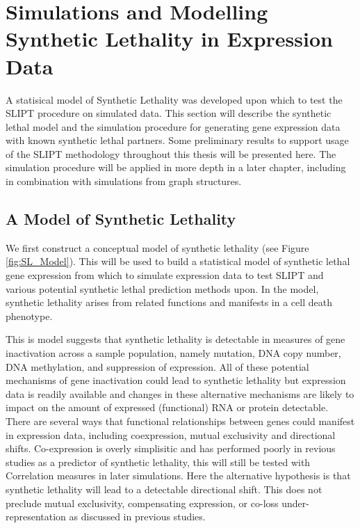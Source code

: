 

\section{Simulations and Modelling Synthetic Lethality in Expression Data}

A statisical model of Synthetic Lethality was developed upon which to test the SLIPT procedure on simulated data. This section will describe the synthetic lethal model and the simulation procedure for generating gene expression data with known synthetic lethal partners. Some preliminary results to support usage of the SLIPT methodology throughout this thesis will be presented here. The simulation procedure will be applied in more depth in a later chapter, including in combination with simulations from graph structures.

\subsection{A Model of Synthetic Lethality} \label{methods:SL_Model}

We first construct a conceptual model of synthetic lethality (see Figure \ref{fig:SL_Model}). This will be used to build a statistical model of synthetic lethal gene expression from which to simulate expression data to test SLIPT and various potential synthetic lethal prediction methods upon. In the model, synthetic lethality arises from related functions and manifests in a cell death phenotype.

This is model suggests that synthetic lethality is detectable in measures of gene inactivation across a sample population, namely mutation, DNA copy number, DNA methylation, and suppression of expression. All of these potential mechanisms of gene inactivation could lead to synthetic lethality but expression data is readily available and changes in these alternative mechanisms are likely to impact on the amount of expressed (functional) RNA or protein detectable. There are several ways that functional relationships between genes could manifest in expression data, including coexpression, mutual exclusivity and directional shifts. Co-expression is overly simplisitic and has performed poorly in revious studies as a predictor of synthetic lethality, this will still be tested with Correlation measures in later simulations. Here the alternative hypothesis is that synthetic lethality will lead to a detectable directional shift. This does not preclude mutual exclusivity, compensating expression, or co-loss under-representation as discussed in previous studies. 


